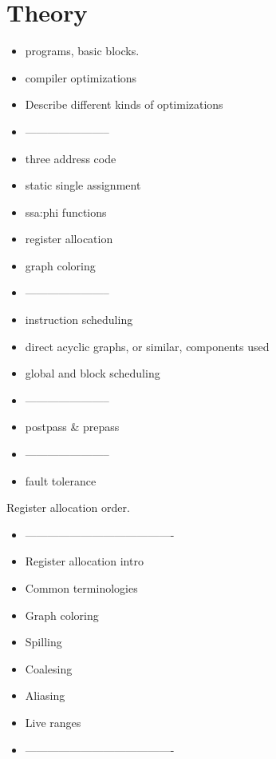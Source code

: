 \chapter{Theory}

\begin{itemize}
    \item programs, basic blocks.
    \item compiler optimizations
    \item Describe different kinds of optimizations
    \item -----------------------
    \item three address code
    \item static single assignment
    \item ssa:phi functions
    \item register allocation
    \item graph coloring 
    \item -----------------------
    \item instruction scheduling
    \item direct acyclic graphs, or similar, components used
    \item global and block scheduling
    \item -----------------------
    \item postpass \& prepass
    \item -----------------------
    
    \item fault tolerance \\
\end{itemize}

Register allocation order.
\begin{itemize}
    \item ----------------------------------------
    \item Register allocation intro
    \item Common terminologies
    \item Graph coloring
        \item Spilling
        \item Coalesing
    \item Aliasing
    \item Live ranges
    \item ----------------------------------------
\end{itemize}

